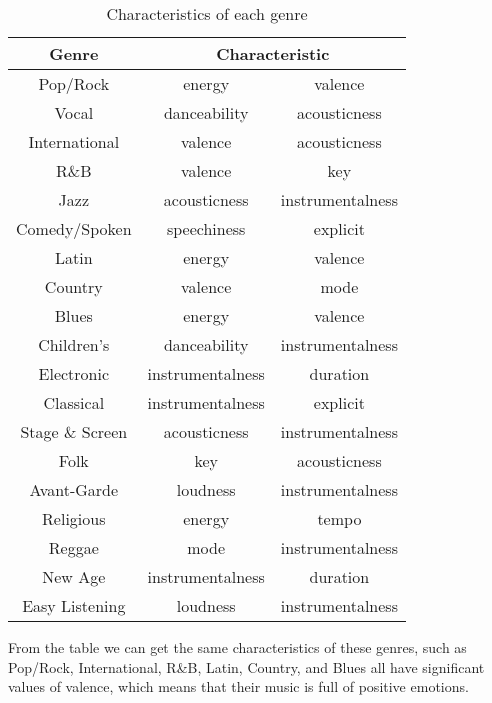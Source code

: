 \documentclass[12pt]{article}  %
\begin{document}
\begin{table}[H]
	\centering
	\begin{tabular}{|c|c|c|}
		\hline
		Genre           & \multicolumn{2}{c|}{Characteristic} \\ \hline
		Pop/Rock        & energy           & valence          \\ \hline
		Vocal           & danceability     & acousticness     \\ \hline
		International   & valence          & acousticness     \\ \hline
		R\&B            & valence          & key              \\ \hline
		Jazz            & acousticness     & instrumentalness \\ \hline
		Comedy/Spoken   & speechiness      & explicit         \\ \hline
		Latin           & energy           & valence          \\ \hline
		Country         & valence          & mode             \\ \hline
		Blues           & energy           & valence          \\ \hline
		Children's      & danceability     & instrumentalness \\ \hline
		Electronic      & instrumentalness & duration         \\ \hline
		Classical       & instrumentalness & explicit         \\ \hline
		Stage \& Screen & acousticness     & instrumentalness \\ \hline
		Folk            & key              & acousticness     \\ \hline
		Avant-Garde     & loudness         & instrumentalness \\ \hline
		Religious       & energy           & tempo            \\ \hline
		Reggae          & mode             & instrumentalness \\ \hline
		New Age         & instrumentalness & duration         \\ \hline
		Easy Listening  & loudness         & instrumentalness \\ \hline
	\end{tabular}
	\caption{Characteristics of each genre}
\end{table}

From the table we can get the same characteristics of these genres, such as Pop/Rock, International, R\&B, Latin, Country, and Blues all have significant values of valence, which means that their music is full of positive emotions.
\end{document}
